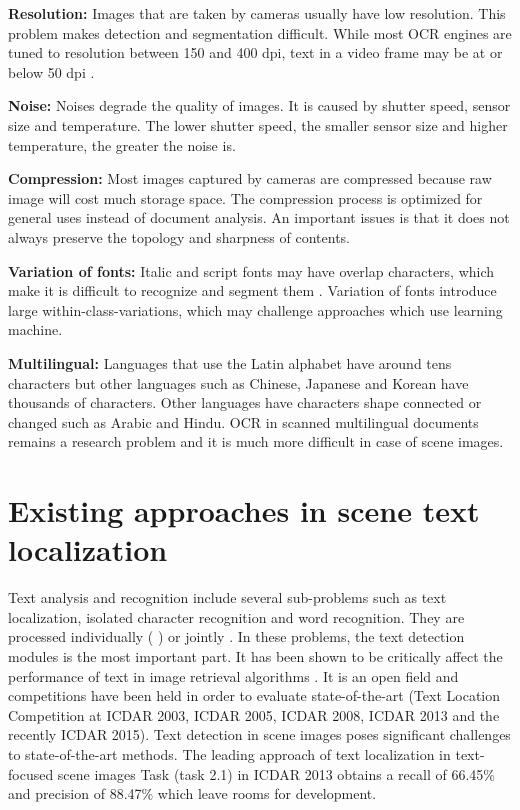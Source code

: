 \textbf{Resolution:} Images that are taken by cameras usually have low resolution. This problem makes detection and segmentation difficult. While most OCR engines are tuned to resolution between 150 and 400 dpi, text in a video frame may be at or below 50 dpi \cite{Liang.2005.IJDAR}.

\textbf{Noise: } Noises degrade the quality of images. It is caused by shutter speed, sensor size and temperature. The lower shutter speed, the smaller sensor size and higher temperature, the greater the noise is. 

\textbf{Compression: } Most images captured by cameras are compressed because raw image will cost much storage space. The compression process is optimized for general uses instead of document analysis. An important issues is that it does not always preserve the topology and sharpness of contents.

\textbf{Variation of fonts: } Italic and script fonts may have overlap characters, which make it is difficult to recognize and segment them \cite{Liu.2011.ICDAR}. Variation of fonts introduce large within-class-variations, which may challenge approaches which use learning machine.

\textbf{Multilingual: } Languages that use the Latin alphabet have around tens characters but other languages such as Chinese, Japanese and Korean have thousands of characters. Other languages have characters shape connected or changed such as Arabic and Hindu. OCR in scanned multilingual documents remains a research problem \cite{Smith.2009.IWMO} and it is much more difficult in case of scene images.


\section{Existing approaches in scene text localization}
Text analysis and recognition include several sub-problems such as text localization, isolated character recognition and word recognition. They are processed individually (\cite{Campos.2010.CVPR} \cite{Chen.2004.CVPR} \cite{Liu.2006.CRA} \cite{Epshtein.2010.CVPR} \cite{xucheng.2013.pami}) or jointly \cite{Neumann12}. In these problems, the text detection modules is the most important part. It has been shown to be critically affect the performance of text in image retrieval algorithms \cite{Epshtein.2010.CVPR}. It is an open field and competitions have been held in order to evaluate state-of-the-art (Text Location Competition at ICDAR 2003, ICDAR 2005, ICDAR 2008, ICDAR 2013 and the recently ICDAR 2015). Text detection in scene images  poses significant challenges to state-of-the-art methods. The leading approach of text localization in text-focused scene images Task (task 2.1) in ICDAR 2013 obtains a recall of 66.45\% and precision of 88.47\% \cite{ICDAR.2013} which leave rooms for development. 


